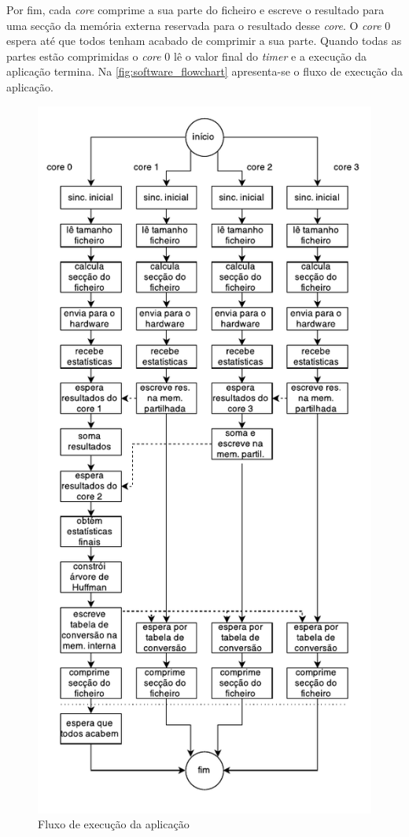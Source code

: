 Por fim, cada \textit{core} comprime a sua parte do ficheiro e escreve o resultado para uma secção da memória externa reservada para o resultado desse \textit{core}. O \textit{core} 0 espera até que todos tenham acabado de comprimir a sua parte. Quando todas as partes estão comprimidas o \textit{core} 0 lê o valor final do \textit{timer} e a execução da aplicação termina. Na \autoref{fig:software_flowchart} apresenta-se o fluxo de execução da aplicação.


\begin{figure}[H]
\centering
\includegraphics[height=0.95\textheight]{img/flowchart.pdf}
\caption{Fluxo de execução da aplicação}
\label{fig:software_flowchart}
\end{figure}